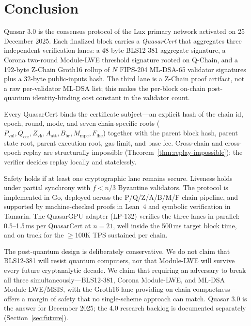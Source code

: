 \section{Conclusion}

\label{sec:conclusion}

Quasar 3.0 is the consensus protocol of the Lux primary network
activated on 25 December 2025. Each finalized block carries a
\emph{QuasarCert} that aggregates three independent verification lanes:
a 48-byte BLS12-381 aggregate signature, a Corona two-round Module-LWE
threshold signature rooted on Q-Chain, and a 192-byte Z-Chain Groth16
rollup of $N$ FIPS-204 ML-DSA-65 validator signatures plus a 32-byte
public-inputs hash. The third lane is a Z-Chain proof artifact, not a
raw per-validator ML-DSA list; this makes the per-block on-chain
post-quantum identity-binding cost constant in the validator count.

Every QuasarCert binds the certificate subject---an explicit hash of the
chain id, epoch, round, mode, and seven chain-specific roots
($P_\text{val}, Q_\text{cer}, Z_\text{vk}, A_\text{att}, B_\text{br},
M_\text{mpc}, F_\text{fhe}$) together with the parent block hash, parent
state root, parent execution root, gas limit, and base fee. Cross-chain
and cross-epoch replay are structurally impossible
(Theorem~\ref{thm:replay-impossible}); the verifier decides replay
locally and statelessly.

Safety holds if at least one cryptographic lane remains secure.
Liveness holds under partial synchrony with $f < n/3$ Byzantine
validators. The protocol is implemented in Go, deployed across the
P/Q/Z/A/B/M/F chain pipeline, and supported by machine-checked proofs
in Lean~4 and symbolic verification in Tamarin. The QuasarGPU
adapter (LP-132) verifies the three lanes in parallel: 0.5--1.5\,ms per
QuasarCert at $n{=}21$, well inside the 500\,ms target block time, and
on track for the $\geq$100K TPS sustained per chain.

The post-quantum design is deliberately conservative. We do not claim
that BLS12-381 will resist quantum computers, nor that Module-LWE will
survive every future cryptanalytic decade. We claim that requiring an
adversary to break all three simultaneously---BLS12-381, Corona
Module-LWE, and ML-DSA Module-LWE/MSIS, with the Groth16 lane providing
on-chain compactness---offers a margin of safety that no single-scheme
approach can match. Quasar 3.0 is the answer for December 2025; the
4.0 research backlog is documented separately
(Section~\ref{sec:future}).

